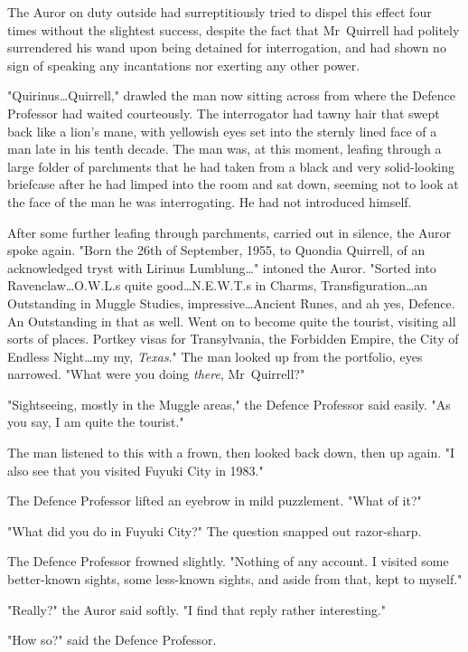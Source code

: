 The Auror on duty outside had surreptitiously tried to dispel this effect four
times without the slightest success, despite the fact that Mr~Quirrell had
politely surrendered his wand upon being detained for interrogation, and had
shown no sign of speaking any incantations nor exerting any other power.

"Quirinus…Quirrell," drawled the man now sitting across from where the
Defence Professor had waited courteously. The interrogator had tawny hair that
swept back like a lion's mane, with yellowish eyes set into the sternly lined
face of a man late in his tenth decade. The man was, at this moment, leafing
through a large folder of parchments that he had taken from a black and very
solid-looking briefcase after he had limped into the room and sat down, seeming
not to look at the face of the man he was interrogating. He had not introduced
himself.

After some further leafing through parchments, carried out in silence, the
Auror spoke again. "Born the 26th of September, 1955, to Quondia Quirrell, of
an acknowledged tryst with Lirinus Lumblung…" intoned the Auror. "Sorted
into Ravenclaw…O.W.L.s quite good…N.E.W.T.s in Charms,
Transfiguration…an Outstanding in Muggle Studies, impressive…Ancient
Runes, and ah yes, Defence. An Outstanding in that as well. Went on to
become quite the tourist, visiting all sorts of places. Portkey visas for
Transylvania, the Forbidden Empire, the City of Endless Night…my my,
\emph{Texas}." The man looked up from the portfolio, eyes narrowed. "What were
you doing \emph{there}, Mr~Quirrell?"

"Sightseeing, mostly in the Muggle areas," the Defence Professor said easily.
"As you say, I am quite the tourist."

The man listened to this with a frown, then looked back down, then up again. "I
also see that you visited Fuyuki City in 1983."

The Defence Professor lifted an eyebrow in mild puzzlement. "What of it?"

"What did you do in Fuyuki City?" The question snapped out razor-sharp.

The Defence Professor frowned slightly. "Nothing of any account. I visited some
better-known sights, some less-known sights, and aside from that, kept to
myself."

"Really?" the Auror said softly. "I find that reply rather interesting."

"How so?" said the Defence Professor.

